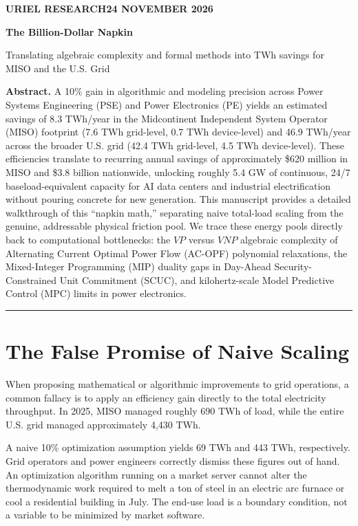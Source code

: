 \documentclass[11pt, a4paper]{article}
\begin{document}
\thispagestyle{plain}
{\small\bfseries\color{accent}URIEL RESEARCH\hfill 24 NOVEMBER 2026}\par\vspace{14pt}
{\Huge\bfseries\color{ink}The Billion-Dollar Napkin\par}\vspace{6pt}
{\Large\color{muted}Translating algebraic complexity and formal methods into TWh savings for MISO and the U.S. Grid\par}\vspace{14pt}

\textbf{Abstract.} A 10\% gain in algorithmic and modeling precision across Power Systems Engineering (PSE) and Power Electronics (PE) yields an estimated savings of 8.3 TWh/year in the Midcontinent Independent System Operator (MISO) footprint (7.6 TWh grid-level, 0.7 TWh device-level) and 46.9 TWh/year across the broader U.S. grid (42.4 TWh grid-level, 4.5 TWh device-level). These efficiencies translate to recurring annual savings of approximately \$620 million in MISO and \$3.8 billion nationwide, unlocking roughly 5.4 GW of continuous, 24/7 baseload-equivalent capacity for AI data centers and industrial electrification without pouring concrete for new generation. This manuscript provides a detailed walkthrough of this ``napkin math,'' separating naive total-load scaling from the genuine, addressable physical friction pool. We trace these energy pools directly back to computational bottlenecks: the $VP$ versus $VNP$ algebraic complexity of Alternating Current Optimal Power Flow (AC-OPF) polynomial relaxations, the Mixed-Integer Programming (MIP) duality gaps in Day-Ahead Security-Constrained Unit Commitment (SCUC), and kilohertz-scale Model Predictive Control (MPC) limits in power electronics.

\vspace{1em}
\hrule
\vspace{1em}

\section{The False Promise of Naive Scaling}

When proposing mathematical or algorithmic improvements to grid operations, a common fallacy is to apply an efficiency gain directly to the total electricity throughput. In 2025, MISO managed roughly 690 TWh of load, while the entire U.S. grid managed approximately 4,430 TWh. 

A naive 10\% optimization assumption yields 69 TWh and 443 TWh, respectively. Grid operators and power engineers correctly dismiss these figures out of hand. An optimization algorithm running on a market server cannot alter the thermodynamic work required to melt a ton of steel in an electric arc furnace or cool a residential building in July. The end-use load is a boundary condition, not a variable to be minimized by market software.
\end{document}

